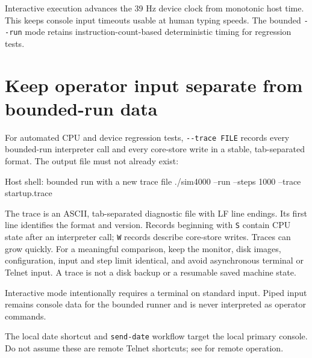 Interactive execution advances the 39 Hz device clock from monotonic host time. This keeps console input timeouts usable at human typing speeds. The bounded \passthrough{\lstinline!--run!} mode retains instruction-count-based deterministic timing for regression tests.

\section{Keep operator input separate from bounded-run data}\label{keep-operator-input-separate-from-bounded-run-data}

For automated CPU and device regression tests, \passthrough{\lstinline!--trace FILE!} records every bounded-run interpreter call and every core-store write in a stable, tab-separated format. The output file must not already exist:

\begin{commandexample}[language=sh]{Host shell: bounded run with a new trace file}
./sim4000 --run --steps 1000 --trace startup.trace
\end{commandexample}

The trace is an ASCII, tab-separated diagnostic file with LF line endings.
Its first line identifies the format and version. Records beginning with
\texttt{S} contain CPU state after an interpreter call; \texttt{W} records
describe core-store writes. Traces can grow quickly. For a meaningful
comparison, keep the monitor, disk images, configuration, input and step
limit identical, and avoid asynchronous terminal or Telnet input. A trace
is not a disk backup or a resumable saved machine state.

Interactive mode intentionally requires a terminal on standard input. Piped input remains console data for the bounded runner and is never interpreted as operator commands.

The local date shortcut and \passthrough{\lstinline!send-date!} workflow target the local primary console. Do not assume these are remote Telnet shortcuts; see  for remote operation.
